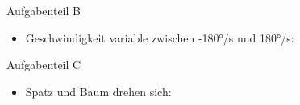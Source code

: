 \documentclass{beamer}
\begin{document}
\begin{frame}{Aufgabenteil B}
\begin{itemize}
\item Geschwindigkeit variable zwischen -180°/s und 180°/s:
\end{itemize}
\begin{figure}
    \centering
\end{figure}
\end{frame}

\begin{frame}{Aufgabenteil C}
\begin{itemize}
\item Spatz und Baum drehen sich:
\end{itemize}
\begin{figure}
    \centering
\end{figure}
\end{frame}
\end{document}
